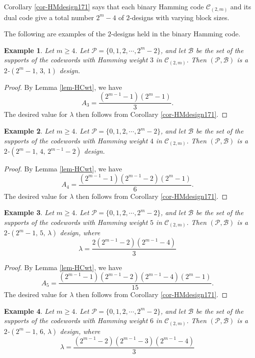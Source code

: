 \documentclass[1p,final]{elsarticle}
\newtheorem{example}{Example}
\newcommand{\cP}{{\mathcal{P}}}
\newcommand{\cB}{{\mathcal{B}}}
\newcommand{\C}{{\mathcal{C}}}
\begin{document}
Corollary \ref{cor-HMdesign171} says that each binary Hamming code $\C_{(2,m)}$ 
and its dual code give a total number $2^m-4$ of $2$-designs with varying block 
sizes. 

The following are examples of the $2$-designs held in the binary Hamming code. 

\begin{example} 
Let $m \geq 4$. Let $\cP=\{0,1,2, \cdots, 2^m-2\}$, and let $\cB$ be  the set of the supports 
of the codewords with Hamming weight $3$ in $\C_{(2,m)}$.  
Then $(\cP, \cB)$ is a $2$-$(2^m-1, \, 3, \, 1)$ design. 
\end{example} 

\begin{proof}
By Lemma \ref{lem-HCwt}, we have 
$$ 
A_3=\frac{(2^{m-1}-1)(2^m-1)}{3}. 
$$
The desired value for $\lambda$ then follows from Corollary \ref{cor-HMdesign171}. 
\end{proof}


\begin{example}\label{exam-hmdesign4} 
Let $m \geq 4$. Let $\cP=\{0,1,2, \cdots, 2^m-2\}$, and let $\cB$ be  the set of the supports 
of the codewords with Hamming weight $4$ in $\C_{(2,m)}$.  
Then $(\cP, \cB)$ is a $2$-$(2^m-1, \, 4, \, 2^{m-1}-2)$ design. 
\end{example} 

\begin{proof}
By Lemma \ref{lem-HCwt}, we have 
$$ 
A_4=\frac{(2^{m-1}-1)(2^{m-1}-2)(2^m-1)}{6}. 
$$
The desired value for $\lambda$ then follows from Corollary \ref{cor-HMdesign171}. 
\end{proof}

\begin{example}\label{exam-hmdesign5}  
Let $m \geq 4$. Let $\cP=\{0,1,2, \cdots, 2^m-2\}$, and let $\cB$ be  the set of the supports 
of the codewords with Hamming weight $5$ in $\C_{(2,m)}$.  
Then $(\cP, \cB)$ is a $2$-$(2^m-1, \, 5, \, \lambda)$ design, where 
$$ 
\lambda=\frac{2(2^{m-1}-2)(2^{m-1}-4)}{3} 
$$  
\end{example} 

\begin{proof}
By Lemma \ref{lem-HCwt}, we have 
$$ 
A_5=\frac{(2^{m-1}-1)(2^{m-1}-2)(2^{m-1}-4)(2^m-1)}{15}. 
$$
The desired value for $\lambda$ then follows from Corollary \ref{cor-HMdesign171}. 
\end{proof}

\begin{example}\label{exam-hmdesign6}  
Let $m \geq 4$. Let $\cP=\{0,1,2, \cdots, 2^m-2\}$, and let $\cB$ be  the set of the supports 
of the codewords with Hamming weight $6$ in $\C_{(2,m)}$.  
Then $(\cP, \cB)$ is a $2$-$(2^m-1, \, 6, \, \lambda)$ design, where 
$$ 
\lambda=\frac{(2^{m-1}-2)(2^{m-1}-3)(2^{m-1}-4)}{3} 
$$  
\end{example} 
\end{document}
